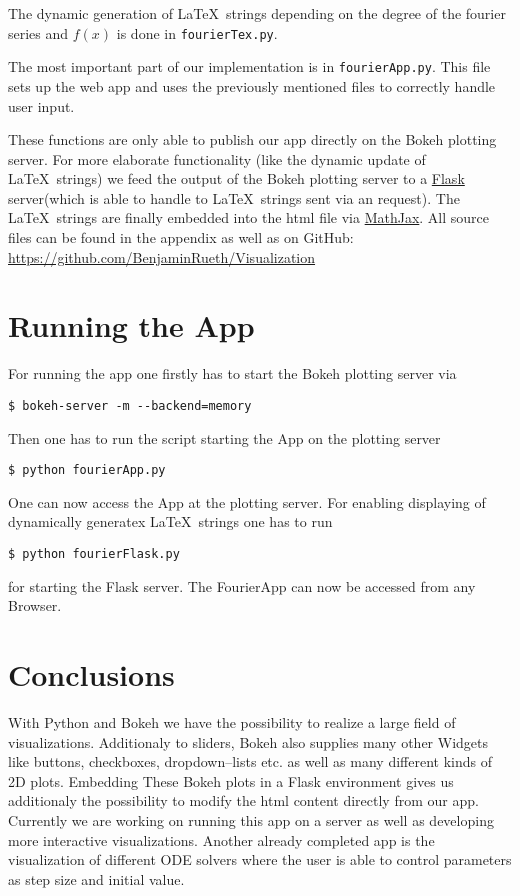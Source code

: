 \documentclass[a4paper,pdftex]{scrartcl}
\begin{document}
The dynamic generation of \LaTeX\ strings depending on the degree of the fourier series and $f(x)$ is done in \verb!fourierTex.py!.

The most important part of our implementation is in \verb!fourierApp.py!. This file sets up the web app and uses the previously mentioned files to correctly handle user input.

These functions are only able to publish our app directly on the Bokeh plotting server. For more elaborate functionality (like the dynamic update of \LaTeX\ strings) we feed the output of the Bokeh plotting server to a \href{http://flask.pocoo.org/}{Flask} server(which is able to handle to \LaTeX\ strings sent via an request). The \LaTeX\ strings are finally embedded into the html file via \href{https://www.mathjax.org/}{MathJax}.
All source files can be found in the appendix as well as on GitHub: \href{https://github.com/BenjaminRueth/Visualization}{https://github.com/BenjaminRueth/Visualization}

\section{Running the App}
For running the app one firstly has to start the Bokeh plotting server via
\begin{verbatim}
$ bokeh-server -m --backend=memory
\end{verbatim}
Then one has to run the script starting the App on the plotting server
\begin{verbatim}
$ python fourierApp.py
\end{verbatim}
One can now access the App at the plotting server. For enabling displaying of dynamically generatex \LaTeX\ strings one has to run
\begin{verbatim}
$ python fourierFlask.py
\end{verbatim}
for starting the Flask server. The FourierApp can now be accessed from any Browser.

\section{Conclusions}
With Python and Bokeh we have the possibility to realize a large field of visualizations. Additionaly to sliders, Bokeh also supplies many other Widgets like buttons, checkboxes, dropdown--lists etc. as well as many different kinds of 2D plots.
Embedding These Bokeh plots in a Flask environment gives us additionaly the possibility to modify the html content directly from our app.
Currently we are working on running this app on a server as well as developing more interactive visualizations. Another already completed app is the visualization of different ODE solvers where the user is able to control parameters as step size and initial value.
\end{document}
